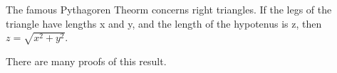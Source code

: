﻿\documentclass[11pt]{article}  %
\begin{document}

The famous Pythagoren Theorm concerns right triangles.  If the legs of
the triangle have lengths x and y, and the length of the hypotenus is z,
then $z = \sqrt{x^2+y^2}$.


There are many proofs of this result.
\end{document}
